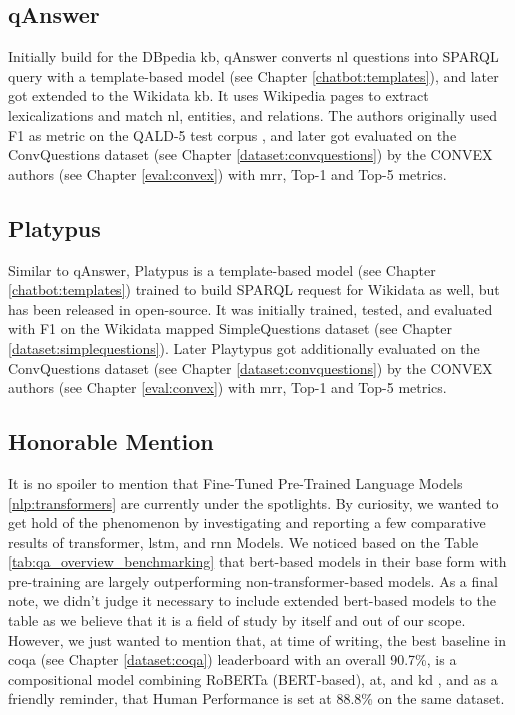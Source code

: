\subsection{qAnswer}
\label{eval:qanswer}
Initially build for the DBpedia \gls{kb}, qAnswer converts \gls{nl} questions into SPARQL query with a template-based model (see Chapter \ref{chatbot:templates}), and later got extended to the Wikidata \gls{kb}. It uses Wikipedia pages to extract lexicalizations and match \gls{nl}, entities, and relations. The authors originally used F1 as metric on the QALD-5 test corpus \autocite{paper:Lopezetal2013}, and later got evaluated on the ConvQuestions dataset (see Chapter \ref{dataset:convquestions}) by the CONVEX authors (see Chapter \ref{eval:convex}) with \gls{mrr}, Top-1 and Top-5 metrics.

\subsection{Platypus}
\label{eval:platypus}
Similar to qAnswer, Platypus \autocite{paper:InProceedingsPellissier-Tanon.P-TD-d-ACM-S_18} is a template-based model (see Chapter \ref{chatbot:templates}) trained to build SPARQL request for Wikidata as well, but has been released in open-source. It was initially trained, tested, and evaluated with F1 on the Wikidata mapped SimpleQuestions dataset (see Chapter \ref{dataset:simplequestions}). Later Playtypus got additionally evaluated on the ConvQuestions dataset (see Chapter \ref{dataset:convquestions}) by the CONVEX authors (see Chapter \ref{eval:convex}) with \gls{mrr}, Top-1 and Top-5 metrics.

\subsection{Honorable Mention}
It is no spoiler to mention that Fine-Tuned Pre-Trained Language Models \ref{nlp:transformers} are currently under the spotlights. By curiosity, we wanted to get hold of the phenomenon by investigating and reporting a few comparative results of \gls{transformer}, \gls{lstm}, and \gls{rnn} Models. We noticed based on the Table \ref{tab:qa_overview_benchmarking} that \gls{bert}-based \autocite{paper:devlin-etal-2019-bert} models in their base form with pre-training are largely outperforming non-\gls{transformer}-based models. As a final note, we didn't judge it necessary to include extended \gls{bert}-based models to the table as we believe that it is a field of study by itself and out of our scope. However, we just wanted to mention that, at time of writing, the best baseline in \gls{coqa} (see Chapter \ref{dataset:coqa}) leaderboard with an overall 90.7\%, is a compositional model combining RoBERTa \autocite{paper:journals/corr/abs-1907-11692} (BERT-based), \gls{at}, and \gls{kd} \autocite{paper:2019arXiv190910772J}, and as a friendly reminder, that Human Performance is set at 88.8\% on the same dataset.


